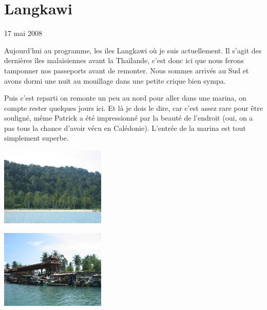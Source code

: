 \section{Langkawi}

17 mai 2008

\begin{multicols}{2}

Aujourd'hui au programme, les iles Langkawi où je suis actuellement. Il s'agit des dernières îles malaisiennes avant la Thaïlande, c'est donc ici que nous ferons tamponner nos passeports avant de remonter. Nous sommes arrivés au Sud et avons dormi une nuit au mouillage dans une petite crique bien sympa.


Puis c'est reparti on remonte un peu au nord pour aller dans une marina, on compte rester quelques jours ici. Et là je dois le dire, car c'est assez rare pour être souligné, même Patrick a été impressionné par la beauté de l'endroit (oui, on a pas tous la chance d'avoir vécu en Calédonie). L'entrée de la marina est tout simplement superbe.

\smallbreak
\hspace*{-0.65cm}
\includegraphics[width=5cm]{articles/langkawi/1211018197eneE.jpg}
\smallbreak

\smallbreak
\hspace*{-0.65cm}
\includegraphics[width=5cm]{articles/langkawi/1211018204F7Ee.jpg}
\smallbreak


\end{multicols}
